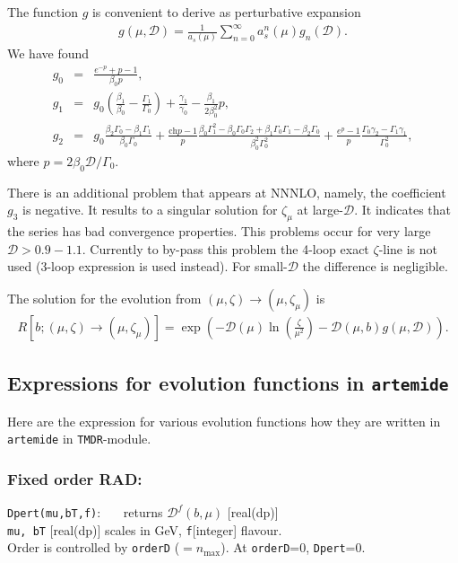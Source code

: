 \documentclass[prd,nofootinbib,eqsecnum,final]{revtex4}
\newcommand{\ch}{\text{ch}}
\renewcommand{\(}{\left(}
\renewcommand{\)}{\right)}
\renewcommand{\[}{\left[}
\renewcommand{\]}{\right]}
\begin{document}
The function $g$ is convenient to derive as perturbative expansion
\begin{eqnarray}\label{TMDR_th:20}
g(\mu,\mathcal{D})=\frac{1}{a_s(\mu)}\sum_{n=0}^\infty a_s^n(\mu) g_n(\mathcal{D}).
\end{eqnarray}
We have found
\begin{eqnarray}
g_0&=&\frac{e^{-p}+p-1}{\beta_0 p},
\\
g_1&=&g_0\(\frac{\beta_1}{\beta_0}-\frac{\Gamma_1}{\Gamma_0}\)+\frac{\gamma_1}{\gamma_0}-\frac{\beta_1}{2\beta_0^2}p,
\\
g_2&=&g_0\frac{\beta_2\Gamma_0-\beta_1\Gamma_1}{\beta_0\Gamma_0}+\frac{\ch p-1}{p}\frac{\beta_0\Gamma_1^2-\beta_0\Gamma_0\Gamma_2+\beta_1\Gamma_0\Gamma_1-\beta_2\Gamma_0}{\beta_0^2\Gamma_0^2}+\frac{e^p-1}{p}\frac{\Gamma_0\gamma_2-\Gamma_1\gamma_1}{\Gamma_0^2},
\end{eqnarray}
where $p=2\beta_0 \mathcal{D}/\Gamma_0$. 

There is an additional problem that appears at NNNLO, namely, the coefficient $g_3$ is negative. It results to a singular solution for  $\zeta_\mu$ at large-$\mathcal{D}$. It indicates that the series has bad convergence properties. This problems occur for very large $\mathcal{D}>0.9 - 1.1$. Currently to by-pass this problem the 4-loop exact $\zeta$-line is not used (3-loop expression is used instead). For small-$\mathcal{D}$ the difference is negligible.

The solution for the evolution from $(\mu,\zeta)\to(\mu,\zeta_\mu)$ is
\begin{eqnarray}
R[b;(\mu,\zeta)\to(\mu,\zeta_\mu)]=\exp\(-\mathcal{D}(\mu)\ln\(\frac{\zeta}{\mu^2}\)-\mathcal{D}(\mu,b)g(\mu,\mathcal{D})\).
\end{eqnarray}


\subsection{Expressions for evolution functions in \texttt{artemide}}

Here are the expression for various evolution functions how they are written in \texttt{artemide} in \texttt{TMDR}-module.

\subsubsection{Fixed order RAD:}
\begin{tcolorbox}
\texttt{Dpert(mu,bT,f)}: ~~~returns $\mathcal{D}^f(b,\mu)$ [real(dp)]
\\
\texttt{mu, bT} [real(dp)] scales in GeV, \texttt{f}[integer] flavour. 
\\
Order is controlled by \texttt{orderD} ($=n_{\text{max}}$). At \texttt{orderD}=0, \texttt{Dpert}=0.
\end{tcolorbox}
\end{document}
